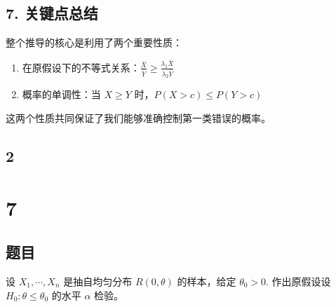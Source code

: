 \documentclass[UTF8]{report}
\theoremstyle{MyLineTheoremStyle} %
\theoremstyle{MyBlockTheoremStyle} %
\theoremstyle{MySubsubsectionStyle} %
\begin{document}
\subsection*{7. 关键点总结}
整个推导的核心是利用了两个重要性质：
\begin{enumerate}
    \item 在原假设下的不等式关系：$\frac{\bar{X}}{\bar{Y}} \geqslant \frac{\lambda_1\bar{X}}{\lambda_2\bar{Y}}$
    \item 概率的单调性：当 $X \geqslant Y$ 时，$P(X > c) \leqslant P(Y > c)$
\end{enumerate}

这两个性质共同保证了我们能够准确控制第一类错误的概率。



\subsection{2}

\section*{7}

\subsection*{题目}
设 $X_1,\cdots,X_n$ 是抽自均匀分布 $R(0,\theta)$ 的样本，给定 $\theta_0>0$. 作出原假设设 $H_0: \theta\leqslant\theta_0$ 的水平 $\alpha$ 检验。
\end{document}
